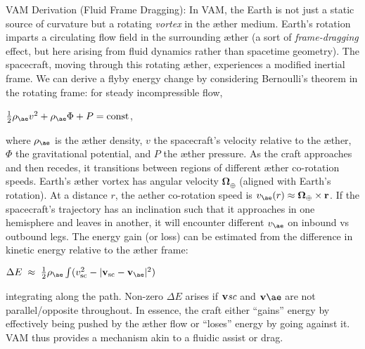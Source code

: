\documentclass[a4paper, aps,preprint,superscriptaddress, 12pt]{revtex4}
\begin{document}
VAM Derivation (Fluid Frame Dragging): In VAM, the Earth is not just a static source of curvature but a rotating \textit{vortex} in the æther medium. Earth’s rotation imparts a circulating flow field in the surrounding æther (a sort of \textit{frame-dragging} effect, but here arising from fluid dynamics rather than spacetime geometry). The spacecraft, moving through this rotating æther, experiences a modified inertial frame. We can derive a flyby energy change by considering Bernoulli’s theorem in the rotating frame: for steady incompressible flow,

$\frac{1}{2}\rho_{\ae} v^2 + \rho_{\ae} \Phi + P = \text{const}$,

where $\rho_{\ae}$ is the æther density, $v$ the spacecraft’s velocity relative to the æther, $\Phi$ the gravitational potential, and $P$ the æther pressure. As the craft approaches and then recedes, it transitions between regions of different æther co-rotation speeds. Earth’s æther vortex has angular velocity $\boldsymbol\Omega_{\oplus}$ (aligned with Earth’s rotation). At a distance $r$, the aether co-rotation speed is $v_{\ae}(r)\approx \boldsymbol\Omega_{\oplus}\times \mathbf{r}$. If the spacecraft’s trajectory has an inclination such that it approaches in one hemisphere and leaves in another, it will encounter different $v_{\ae}$ on inbound vs outbound legs. The energy gain (or loss) can be estimated from the difference in kinetic energy relative to the æther frame:

$\Delta E \;\approx\; \frac{1}{2} \rho_{\ae} \int (v_{\text{sc}}^2 - |\mathbf{v}_{\text{sc}}-\mathbf{v}_{\ae}|^2)\,$

integrating along the path. Non-zero $\Delta E$ arises if $\mathbf{v}\textit{\text{sc}}$ and $\mathbf{v}{\ae}$ are not parallel/opposite throughout. In essence, the craft either “gains” energy by effectively being pushed by the æther flow or “loses” energy by going against it. VAM thus provides a mechanism akin to a fluidic assist or drag.
\end{document}
